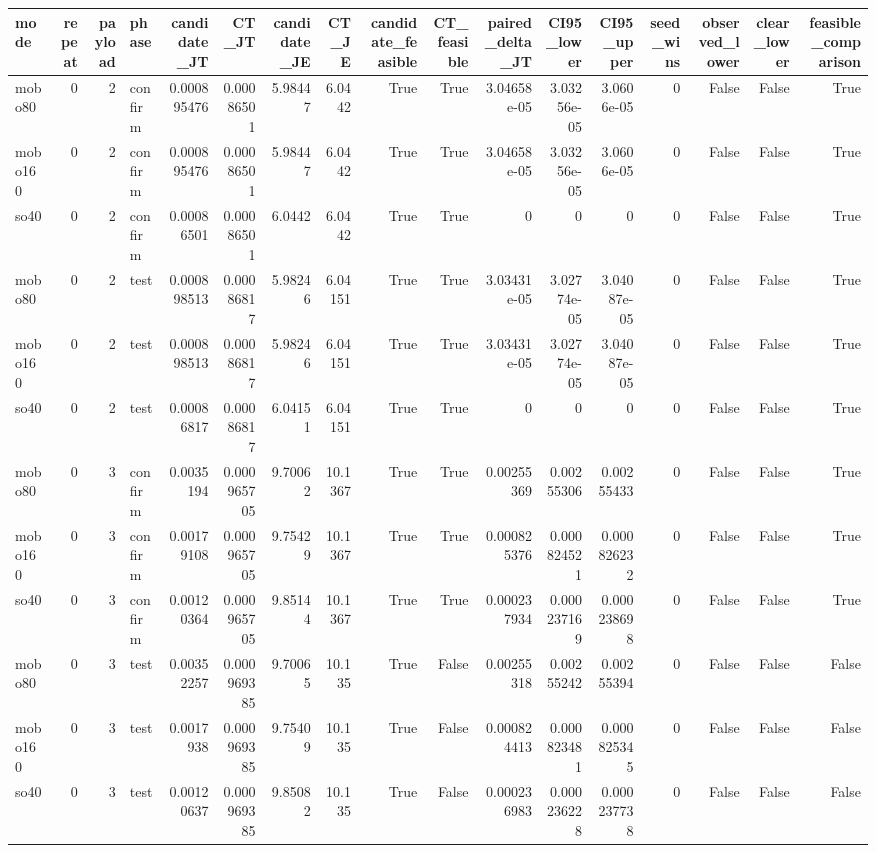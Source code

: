 \begin{tabular}{lrrlrrrrrrrrrrrrr}
\toprule
mode & repeat & payload & phase & candidate\_JT & CT\_JT & candidate\_JE & CT\_JE & candidate\_feasible & CT\_feasible & paired\_delta\_JT & CI95\_lower & CI95\_upper & seed\_wins & observed\_lower & clear\_lower & feasible\_comparison \\
\midrule
mobo80 & 0 & 2 & confirm & 0.000895476 & 0.00086501 & 5.98447 & 6.0442 & True & True & 3.04658e-05 & 3.03256e-05 & 3.0606e-05 & 0 & False & False & True \\
mobo160 & 0 & 2 & confirm & 0.000895476 & 0.00086501 & 5.98447 & 6.0442 & True & True & 3.04658e-05 & 3.03256e-05 & 3.0606e-05 & 0 & False & False & True \\
so40 & 0 & 2 & confirm & 0.00086501 & 0.00086501 & 6.0442 & 6.0442 & True & True & 0 & 0 & 0 & 0 & False & False & True \\
mobo80 & 0 & 2 & test & 0.000898513 & 0.00086817 & 5.98246 & 6.04151 & True & True & 3.03431e-05 & 3.02774e-05 & 3.04087e-05 & 0 & False & False & True \\
mobo160 & 0 & 2 & test & 0.000898513 & 0.00086817 & 5.98246 & 6.04151 & True & True & 3.03431e-05 & 3.02774e-05 & 3.04087e-05 & 0 & False & False & True \\
so40 & 0 & 2 & test & 0.00086817 & 0.00086817 & 6.04151 & 6.04151 & True & True & 0 & 0 & 0 & 0 & False & False & True \\
mobo80 & 0 & 3 & confirm & 0.0035194 & 0.000965705 & 9.70062 & 10.1367 & True & True & 0.00255369 & 0.00255306 & 0.00255433 & 0 & False & False & True \\
mobo160 & 0 & 3 & confirm & 0.00179108 & 0.000965705 & 9.75429 & 10.1367 & True & True & 0.000825376 & 0.000824521 & 0.000826232 & 0 & False & False & True \\
so40 & 0 & 3 & confirm & 0.00120364 & 0.000965705 & 9.85144 & 10.1367 & True & True & 0.000237934 & 0.000237169 & 0.000238698 & 0 & False & False & True \\
mobo80 & 0 & 3 & test & 0.00352257 & 0.000969385 & 9.70065 & 10.135 & True & False & 0.00255318 & 0.00255242 & 0.00255394 & 0 & False & False & False \\
mobo160 & 0 & 3 & test & 0.0017938 & 0.000969385 & 9.75409 & 10.135 & True & False & 0.000824413 & 0.000823481 & 0.000825345 & 0 & False & False & False \\
so40 & 0 & 3 & test & 0.00120637 & 0.000969385 & 9.85082 & 10.135 & True & False & 0.000236983 & 0.000236228 & 0.000237738 & 0 & False & False & False \\

\end{tabular}
